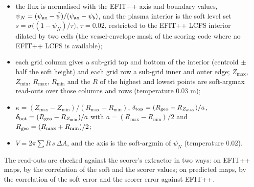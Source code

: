 \documentclass[11pt,a4paper]{article}
\numberwithin{equation}{section}
\begin{document}
\begin{itemize}
\item
  the flux is normalised with the EFIT++ axis and boundary values, \(\psi_N=(\psi_{\rm ax}-\hat\psi)/(\psi_{\rm ax}-\psi_b)\), and the plasma interior is the soft level set \(s=\sigma\big((1-\psi_N)/\tau\big)\), \(\tau=0.02\), restricted to the EFIT++ LCFS interior dilated by two cells (the vessel-envelope mask of the scoring code where no EFIT++ LCFS is available);
\item
  each grid column gives a sub-grid top and bottom of the interior (centroid \(\pm\) half the soft height) and each grid row a sub-grid inner and outer edge; \(Z_{\max}\), \(Z_{\min}\), \(R_{\max}\), \(R_{\min}\) and the \(R\) of the highest and lowest points are soft-argmax read-outs over those columns and rows (temperature 0.03 m);
\item
  \(\kappa=(Z_{\max}-Z_{\min})/(R_{\max}-R_{\min})\), \(\delta_{\rm top}=(R_{\rm geo}-R_{Z_{\max}})/a\), \(\delta_{\rm bot}=(R_{\rm geo}-R_{Z_{\min}})/a\) with \(a=(R_{\max}-R_{\min})/2\) and \(R_{\rm geo}=(R_{\max}+R_{\min})/2\);
\item
  \(V=2\pi\sum R\,s\,\Delta A\), and the axis is the soft-argmin of \(\psi_N\) (temperature 0.02).
\end{itemize}

The read-outs are checked against the scorer's extractor in two ways: on EFIT++ maps, by the correlation of the soft and the scorer values; on predicted maps, by the correlation of the soft error and the scorer error against EFIT++.
\end{document}
